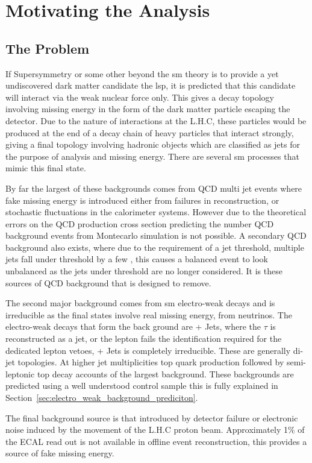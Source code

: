 \chapter{Motivating the \alt Analysis} %
\label{cha:motivating_the_alt_analysis}


\section{The Problem} %
\label{sec:the_problem}
If Supersymmetry or some other beyond the \ac{sm} theory is to provide a 
yet undiscovered dark matter candidate the \ac{lsp}, it is predicted that this 
candidate will interact via the weak nuclear force only. This gives a decay 
topology involving missing energy in the form of the dark matter particle 
escaping the detector. Due to the nature of interactions at the L.H.C, these 
particles would be produced at the end of a decay chain of heavy particles that 
interact strongly, giving a final topology involving hadronic objects which are 
classified as jets for the purpose of analysis and missing energy.
There are several \ac{sm} processes that mimic this final state.

By far the largest of these backgrounds comes from QCD multi jet events where 
fake missing energy is introduced either from failures in reconstruction, or 
stochastic fluctuations in the calorimeter systems.
However due to the theoretical errors on the QCD production cross section 
predicting the number QCD background events from Montecarlo simulation is not 
possible. A secondary QCD background also exists, where due to the requirement 
of a jet \ET threshold, multiple jets fall under threshold by a few \GeV, this 
causes a balanced event to look unbalanced as the jets under threshold are no 
longer considered. It is these sources of QCD background that \alt is designed 
to remove.

The second major background comes from \ac{sm} electro-weak decays and 
is irreducible as the final states involve real missing energy, from 
neutrinos. The electro-weak decays that form the back ground are 
\HepProcess{\PW\to\Ptau\Pnu} + Jets, where the $\tau$ is reconstructed as a 
jet, or the lepton fails the identification required for the dedicated lepton 
vetoes, \HepProcess{\PZ\to\Pnu\APnu} + Jets is completely irreducible. These 
are generally di-jet topologies. At higher jet multiplicities top quark 
production followed by semi-leptonic top decay accounts of the largest 
background. These backgrounds are predicted using a well understood control 
sample this is fully explained in 
Section~\ref{sec:electro_weak_background_prediciton}.

The final background source is that introduced by detector failure or 
electronic noise induced by the movement of the L.H.C proton beam.
Approximately 1$\%$ of the ECAL read out is not available in offline event 
reconstruction, this provides a source of fake missing energy.

